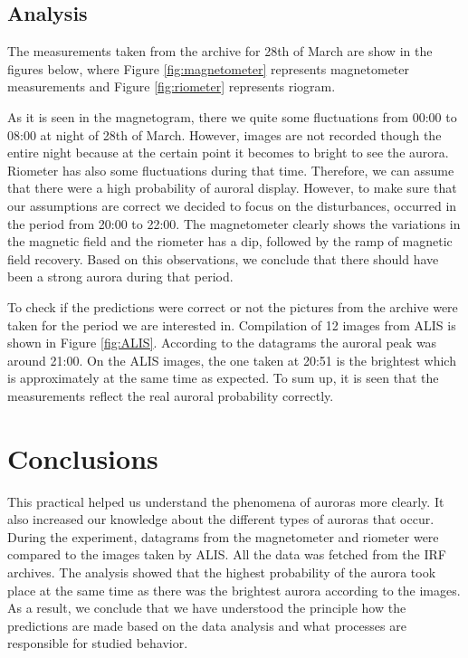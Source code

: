 \documentclass{article}
\begin{document}
\subsection{Analysis}
The measurements taken from the archive for 28th of March are show in the figures below, where Figure \ref{fig:magnetometer} represents magnetometer measurements and Figure \ref{fig:riometer} represents riogram.

As it is seen in the magnetogram, there we quite some fluctuations from 00:00 to 08:00 at night of 28th of March. However, images are not recorded though the entire night because at the certain point it becomes to bright to see the aurora. Riometer has also some fluctuations during that time. Therefore, we can assume that there were a high probability of auroral display. However, to make sure that our assumptions are correct we decided to focus on the disturbances, occurred in the period from 20:00 to 22:00. The magnetometer clearly shows the variations in the magnetic field and the riometer has a dip, followed by the ramp of magnetic field recovery. Based on this observations, we conclude that there should have been a strong aurora during that period.

To check if the predictions were correct or not the pictures from the archive were taken for the period we are interested in. Compilation of 12 images from ALIS is shown in Figure \ref{fig:ALIS}. According to the datagrams the auroral peak was around 21:00. On the ALIS images, the one taken at 20:51 is the brightest which is approximately at the same time as expected. To sum up, it is seen that the measurements reflect the real auroral probability correctly.




\section{Conclusions}
This practical helped us understand the phenomena of auroras more clearly. It also increased our knowledge about the different types of auroras that occur. During the experiment, datagrams from the magnetometer and riometer were compared to the images taken by ALIS. All the data was fetched from the IRF archives. The analysis showed that the highest probability of the aurora took place at the same time as there was the brightest aurora according to the images. As a result, we conclude that we have understood the principle how the predictions are made based on the data analysis and what processes are responsible for studied behavior.
\end{document}
